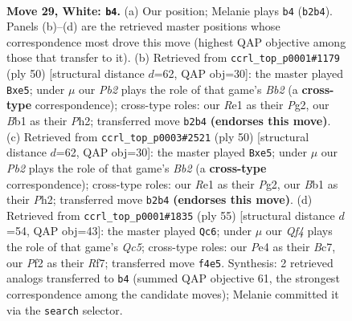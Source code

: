 \documentclass[11pt]{article}
\begin{document}
\clearpage

\begin{figure}[p]\centering
\begin{subfigure}{0.46\textwidth}\centering
\resizebox{\linewidth}{!}{%
\newchessgame
\chessboard[
  setfen={1r1r4/pp3pk1/1q6/7p/b3PQ2/P5Pp/1P3P2/RB2R1K1 w - - 1 29},
  showmover=false,
  pgfstyle=straightmove, color=movearrow, markmove={b2-b4}
]}
\caption{}
\end{subfigure}\hfill
\begin{subfigure}{0.46\textwidth}\centering
\resizebox{\linewidth}{!}{%
\newchessgame
\chessboard[
  setfen={r5k1/pb3pp1/1qr4p/4p3/8/1P3PQ1/PB3RPP/1R4K1 w - - 0 26},
  showmover=false,
  pgfstyle=straightmove, color=movearrow, markmove={b2-e5}
]}
\caption{}
\end{subfigure}
\\[4pt]
\begin{subfigure}{0.46\textwidth}\centering
\resizebox{\linewidth}{!}{%
\newchessgame
\chessboard[
  setfen={r5k1/pb3pp1/1qr4p/4p3/8/1P3PQ1/PB3RPP/1R4K1 w - - 0 26},
  showmover=false,
  pgfstyle=straightmove, color=movearrow, markmove={b2-e5}
]}
\caption{}
\end{subfigure}\hfill
\begin{subfigure}{0.46\textwidth}\centering
\resizebox{\linewidth}{!}{%
\newchessgame
\chessboard[
  setfen={4r2k/2b2r1p/p7/1p3p2/2q1p3/P1P3P1/1P3QNP/1K1R1R2 b - - 3 28},
  showmover=false,
  pgfstyle=straightmove, color=movearrow, markmove={c4-c6}
]}
\caption{}
\end{subfigure}
\caption{\textbf{Move 29, White: \texttt{b4}.} (a) Our position; Melanie plays \texttt{b4} (\texttt{b2b4}). Panels (b)--(d) are the retrieved master positions whose correspondence most drove this move (highest QAP objective among those that transfer to it). (b) Retrieved from \texttt{ccrl\_top\_p0001\#1179} (ply 50) [structural distance $d$=62, QAP obj=30]: the master played \texttt{Bxe5}; under $\mu$ our \emph{Pb2} plays the role of that game's \emph{Bb2} (a \textbf{cross-type} correspondence); cross-type roles: our \emph{R}e1 as their \emph{P}g2, our \emph{B}b1 as their \emph{P}h2; transferred move \texttt{b2b4} \textbf{(endorses this move)}. (c) Retrieved from \texttt{ccrl\_top\_p0003\#2521} (ply 50) [structural distance $d$=62, QAP obj=30]: the master played \texttt{Bxe5}; under $\mu$ our \emph{Pb2} plays the role of that game's \emph{Bb2} (a \textbf{cross-type} correspondence); cross-type roles: our \emph{R}e1 as their \emph{P}g2, our \emph{B}b1 as their \emph{P}h2; transferred move \texttt{b2b4} \textbf{(endorses this move)}. (d) Retrieved from \texttt{ccrl\_top\_p0001\#1835} (ply 55) [structural distance $d$=54, QAP obj=43]: the master played \texttt{Qc6}; under $\mu$ our \emph{Qf4} plays the role of that game's \emph{Qc5}; cross-type roles: our \emph{P}e4 as their \emph{B}c7, our \emph{P}f2 as their \emph{R}f7; transferred move \texttt{f4e5}. Synthesis: 2 retrieved analogs transferred to \texttt{b4} (summed QAP objective 61, the strongest correspondence among the candidate moves); Melanie committed it via the \texttt{search} selector.}
\label{fig:thought-m56}
\end{figure}
\end{document}
